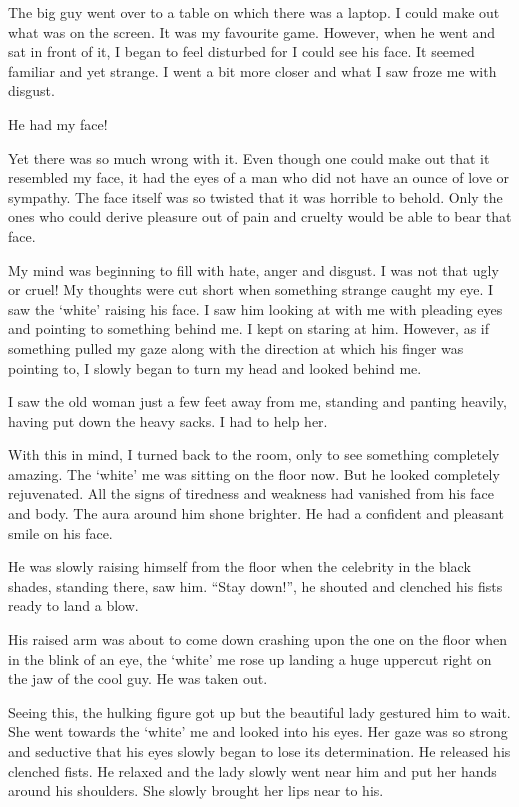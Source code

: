 \documentclass[twoside,11pt,titlepage]{article}
\begin{document}
The big guy went over to a table on which there was a laptop. I could make out what was on the screen. It was my favourite game. However, when he went and sat in front of it, I began to feel disturbed for I could see his face. It seemed familiar and yet strange. I went a bit more closer and what I saw froze me with disgust.

He had my face!

Yet there was so much wrong with it. Even though one could make out that it resembled my face, it had the eyes of a man who did not have an ounce of love or sympathy. The face itself was so twisted that it was horrible to behold. Only the ones who could derive pleasure out of pain and cruelty would be able to bear that face.

My mind was beginning to fill with hate, anger and disgust. I was not that ugly or cruel! My thoughts were cut short when something strange caught my eye. I saw the `white' raising his face. I saw him looking at with me with pleading eyes and pointing to something behind me. I kept on staring at him. However, as if something pulled my gaze along with the direction at which his finger was pointing to, I slowly began to turn my head and looked behind me.

I saw the old woman just a few feet away from me, standing and panting heavily, having put down the heavy sacks. I had to help her.

With this in mind, I turned back to the room, only to see something completely amazing. The `white' me was sitting on the floor now. But he looked completely rejuvenated. All the signs of tiredness and weakness had vanished from his face and body. The aura around him shone brighter. He had a confident and pleasant smile on his face.

He was slowly raising himself from the floor when the celebrity in the black shades, standing there, saw him. ``Stay down!'', he shouted and clenched his fists ready to land a blow.

His raised arm was about to come down crashing upon the one on the floor when in the blink of an eye, the `white' me rose up landing a huge uppercut right on the jaw of the cool guy. He was taken out.

Seeing this, the hulking figure got up but the beautiful lady gestured him to wait. She went towards the `white' me and looked into his eyes. Her gaze was so strong and seductive that his eyes slowly began to lose its determination. He released his clenched fists. He relaxed and the lady slowly went near him and put her hands around his shoulders. She slowly brought her lips near to his.
\end{document}
